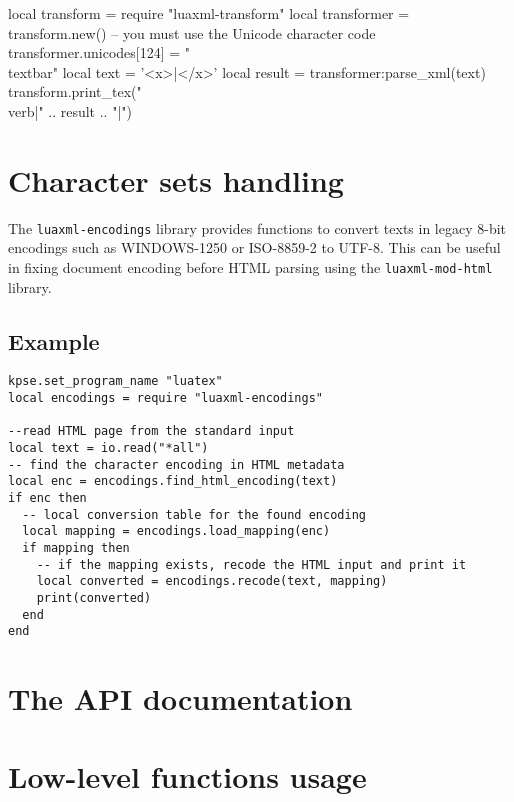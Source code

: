 \documentclass{ltxdoc}
\begin{document}
\begin{framed}
\begin{luacode*}
local transform = require "luaxml-transform"
local transformer = transform.new()
-- you must use the Unicode character code
transformer.unicodes[124] = "\\textbar"
local text = '<x>|</x>'
local result = transformer:parse_xml(text)
transform.print_tex("\\verb|" .. result .. "|")
\end{luacode*}
\end{framed}

\section{Character sets handling}

The \texttt{luaxml-encodings} library provides functions to convert texts in legacy 8-bit encodings such as WINDOWS-1250 
or ISO-8859-2 to UTF-8. This can be useful in fixing document encoding before HTML parsing using the \texttt{luaxml-mod-html}
library. 

\subsection{Example}


\begin{verbatim}
kpse.set_program_name "luatex"
local encodings = require "luaxml-encodings"

--read HTML page from the standard input
local text = io.read("*all")
-- find the character encoding in HTML metadata
local enc = encodings.find_html_encoding(text)
if enc then
  -- local conversion table for the found encoding
  local mapping = encodings.load_mapping(enc)
  if mapping then
    -- if the mapping exists, recode the HTML input and print it
    local converted = encodings.recode(text, mapping)
    print(converted)
  end
end
\end{verbatim}



\section{The API documentation}




\section{Low-level functions usage}
\end{document}
